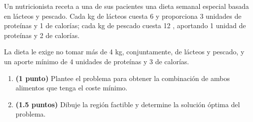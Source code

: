 
Un nutricionista receta a una de sus pacientes una dieta semanal especial basada en lácteos y pescado. Cada kg de lácteos cuesta 6 \texteuro{} y proporciona 3 unidades de proteínas y 1 de calorías; cada kg de pescado cuesta 12 \texteuro{}, aportando 1 unidad de proteínas y 2 de calorías.

La dieta le exige no tomar más de 4 kg, conjuntamente, de lácteos y pescado, y un aporte mínimo de 4 unidades de proteínas y 3 de calorías.
\begin{enumerate}[label=\alph*)]
\item \textbf{(1 punto)} Plantee el problema para obtener la combinación de ambos alimentos que tenga el coste mínimo.
\item \textbf{(1.5 puntos)} Dibuje la región factible y determine la solución óptima del problema.
\end{enumerate}

